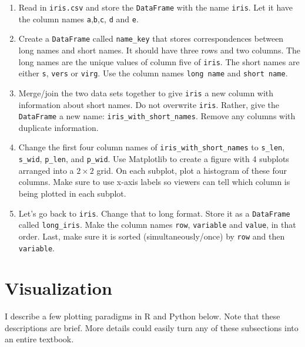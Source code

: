 \documentclass[
  12pt,
  krantz2]{krantz}
\providecommand{\tightlist}{%
  \setlength{\itemsep}{0pt}\setlength{\parskip}{0pt}}
\begin{document}
\begin{enumerate}
\def\labelenumi{\alph{enumi})}
\tightlist
\item
  Read in \texttt{iris.csv} and store the \texttt{DataFrame} with the name \texttt{iris}. Let it have the column names \texttt{\textquotesingle{}a\textquotesingle{}},\texttt{\textquotesingle{}b\textquotesingle{}},\texttt{\textquotesingle{}c\textquotesingle{}}, \texttt{\textquotesingle{}d\textquotesingle{}} and \texttt{\textquotesingle{}e\textquotesingle{}}.
\item
  Create a \texttt{DataFrame} called \texttt{name\_key} that stores correspondences between long names and short names. It should have three rows and two columns. The long names are the unique values of column five of \texttt{iris}. The short names are either \texttt{\textquotesingle{}s\textquotesingle{}}, \texttt{\textquotesingle{}vers\textquotesingle{}} or \texttt{\textquotesingle{}virg\textquotesingle{}}. Use the column names \texttt{\textquotesingle{}long\ name\textquotesingle{}} and \texttt{\textquotesingle{}short\ name\textquotesingle{}}.
\item
  Merge/join the two data sets together to give \texttt{iris} a new column with information about short names. Do not overwrite \texttt{iris}. Rather, give the \texttt{DataFrame} a new name: \texttt{iris\_with\_short\_names}. Remove any columns with duplicate information.
\item
  Change the first four column names of \texttt{iris\_with\_short\_names} to \texttt{s\_len}, \texttt{s\_wid}, \texttt{p\_len}, and \texttt{p\_wid}. Use Matplotlib to create a figure with 4 subplots arranged into a \(2 \times 2\) grid. On each subplot, plot a histogram of these four columns. Make sure to use x-axis labels so viewers can tell which column is being plotted in each subplot.
\item
  Let's go back to \texttt{iris}. Change that to long format. Store it as a \texttt{DataFrame} called \texttt{long\_iris}. Make the column names \texttt{row}, \texttt{variable} and \texttt{value}, in that order. Last, make sure it is sorted (simultaneously/once) by \texttt{row} and then \texttt{variable}.
\end{enumerate}

\hypertarget{visualization}{%
\chapter{Visualization}\label{visualization}}

I describe a few plotting paradigms in R and Python below. Note that these descriptions are brief. More details could easily turn any of these subsections into an entire textbook.
\end{document}
